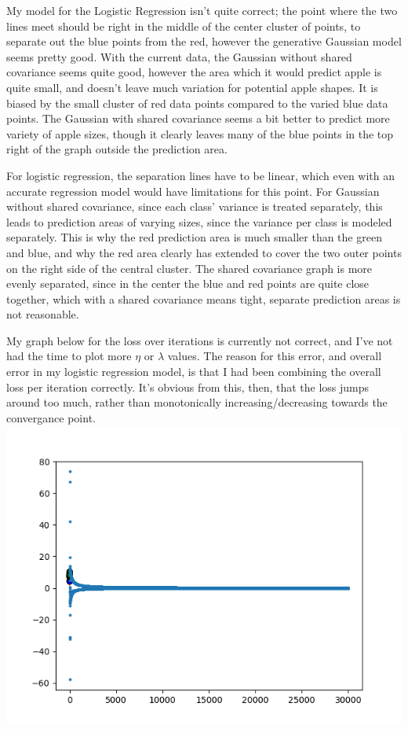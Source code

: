 \documentclass[submit]{harvardml}
\begin{document}
My model for the Logistic Regression isn't quite correct; the point where the
two lines meet should be right in the middle of the center cluster of points,
to separate out the blue points from the red, however the generative Gaussian
model seems pretty good. With the current data, the Gaussian without shared
covariance seems quite good, however the area which it would predict apple is
quite small, and doesn't leave much variation for potential apple shapes. It is
biased by the small cluster of red data points compared to the varied blue data
points. The Gaussian with shared covariance seems a bit better to predict more
variety of apple sizes, though it clearly leaves many of the blue points in the
top right of the graph outside the prediction area.

For logistic regression, the separation lines have to be linear, which even
with an accurate regression model would have limitations for this point. For
Gaussian without shared covariance, since each class' variance is treated
separately, this leads to prediction areas of varying sizes, since the variance
per class is modeled separately. This is why the red prediction area is much
smaller than the green and blue, and why the red area clearly has extended to
cover the two outer points on the right side of the central cluster. The shared
covariance graph is more evenly separated, since in the center the blue and red
points are quite close together, which with a shared covariance means tight,
separate prediction areas is not reasonable.

My graph below for the loss over iterations is currently not correct, and I've
not had the time to plot more $\eta$ or $\lambda$ values. The reason for this
error, and overall error in my logistic regression model, is that I had been
combining the overall loss per iteration correctly. It's obvious from this,
then, that the loss jumps around too much, rather than monotonically
increasing/decreasing towards the convergance point.
\includegraphics[scale=.5]{loss_per_iter.png}
\end{document}
